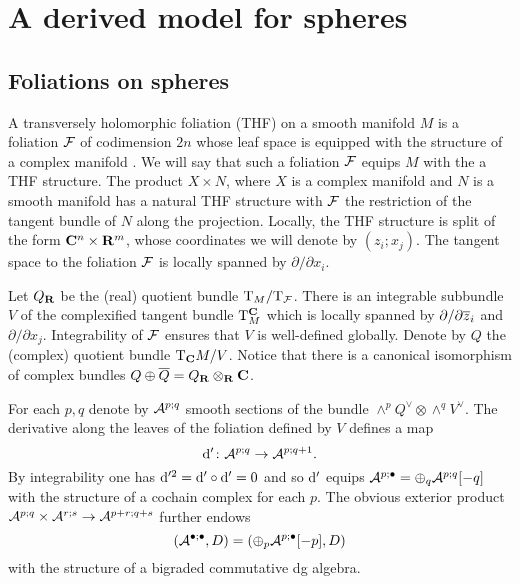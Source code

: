 \documentclass[../main.tex]{subfiles}
\begin{document}
 

\section{A derived model for spheres}

\subsection{Foliations on spheres}

A transversely holomorphic foliation (THF) on a smooth manifold $M$ is a foliation $\mathcal F$ of codimension $2n$ whose leaf space is equipped with the structure of a complex manifold \cite{Asuke,Rawnsley}. 
We will say that such a foliation $\mathcal F$ equips $M$ with the a THF structure. 
The product $X \times N$, where $X$ is a complex manifold and $N$ is a smooth manifold has a natural THF structure with $\mathcal F$ the restriction of the tangent bundle of $N$ along the projection.
Locally, the THF structure is split of the form $\mathbf{C}^n \times \mathbf{R}^m$, whose coordinates we will denote by $(z_i ;  x_j)$.
The tangent space to the foliation $\mathcal F$ is locally spanned by $\partial / \partial x_i$. 

Let $Q_{\mathbf{R}}$ be the (real) quotient bundle ${\rm T}_M / {\rm T}_\mathcal F$. 
There is an integrable subbundle $V$ of the complexified tangent bundle ${\rm T}^{\mathbf{C}}_ M$ which is locally spanned by $\partial / \partial {\overline{z}}_i$ and $\partial / \partial x_j$. 
Integrability of $\mathcal F$ ensures that $V$ is well-defined globally. 
Denote by $Q$ the (complex) quotient bundle ${\rm T}_{\mathbf{C}} M / V$.
Notice that there is a canonical isomorphism of complex bundles $Q \oplus \overline{Q} = Q_{\mathbf{R}} \otimes_{\mathbf{R}} \mathbf{C}$. 


For each $p,q$ denote by $\mathcal A^{p;q}$ smooth sections of the bundle $\wedge^p Q^\vee \otimes \wedge^q V^\vee$. 
The derivative along the leaves of the foliation defined by $V$ defines a map 
\[
{\rm d}' \colon \mathcal A^{p;q} \to \mathcal A^{p;q+1}  .
\]
By integrability one has ${\rm d}'^2 = {\rm d}' \circ {\rm d}' = 0$ and so ${\rm d}'$ equips $\mathcal A^{p;\bullet} = \oplus_q \mathcal A^{p;q}[-q]$ with the structure of a cochain complex for each $p$. 
The obvious exterior product $\mathcal A^{p;q} \times \mathcal A^{r;s} \to \mathcal A^{p+r;q+s}$ further endows 
\[
\left(\mathcal A^{\bullet;\bullet}, D\right) = \left(\oplus_p \mathcal A^{p;\bullet}[-p] , D \right) 
\]
with the structure of a bigraded commutative dg algebra.
\end{document}
